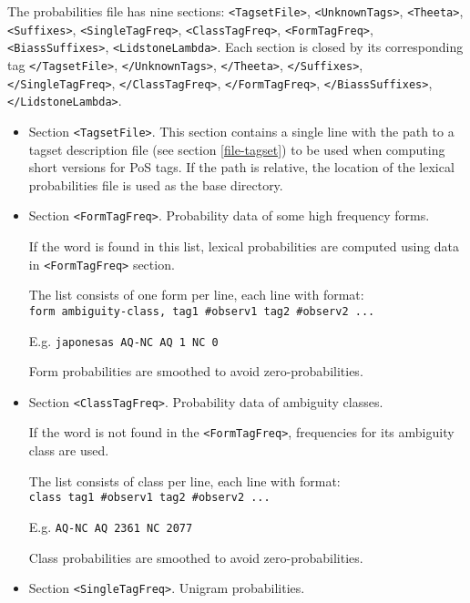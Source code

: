 \documentclass[a4paper]{book}
\begin{document}
The probabilities file has nine sections: \verb#<TagsetFile>#, \verb#<UnknownTags>#,
\verb#<Theeta>#, \verb#<Suffixes>#, \verb#<SingleTagFreq>#,
\verb#<ClassTagFreq>#, \verb#<FormTagFreq>#, \verb#<BiassSuffixes>#, 
 \verb#<LidstoneLambda>#.
 Each section is closed by
its corresponding tag  \verb#</TagsetFile>#, \verb#</UnknownTags>#, \verb#</Theeta>#,
\verb#</Suffixes>#, \verb#</SingleTagFreq>#, \verb#</ClassTagFreq>#,
\verb#</FormTagFreq>#, \verb#</BiassSuffixes>#, \verb#</LidstoneLambda>#.

 \begin{itemize} 

  \item Section \verb#<TagsetFile>#.  This section contains a single
    line with the path to a tagset description file (see section
    \ref{file-tagset}) to be used when computing short versions for PoS
    tags.  If the path is relative, the location of the lexical
    probabilities file is used as the base directory.

  \item Section \verb#<FormTagFreq>#.  Probability data of some high frequency forms.

   If the word is found in this list, lexical probabilities are
   computed using data in \verb#<FormTagFreq># section.
 
   The list consists of one form per line, each line with format: \\
   {\tt form ambiguity-class, tag1 \#observ1 tag2 \#observ2 ...}
   
   E.g. {\tt japonesas AQ-NC AQ 1 NC 0}

   Form probabilities are smoothed to avoid zero-probabilities. 

   \item Section \verb#<ClassTagFreq>#. Probability data of ambiguity classes.

   If the word is not found in the \verb#<FormTagFreq>#, frequencies
   for its ambiguity class are used.

   The list consists of class per line, each line with format:\\
   {\tt class tag1 \#observ1 tag2 \#observ2 ...}

   E.g. {\tt AQ-NC AQ 2361 NC 2077}

   Class probabilities are smoothed to avoid zero-probabilities.  

   \item Section \verb#<SingleTagFreq>#. Unigram probabilities. 


\end{itemize}
\end{document}
